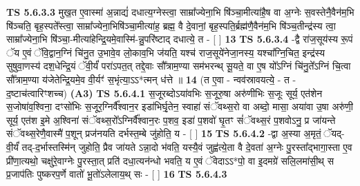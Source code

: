 \documentclass[17pt]{extarticle}
\begin{document}
                                \textbf{ TS 5.6.3.3} \newline
                  मुख॒त ए॒वास्मा॑ अ॒न्नाद्यं॑ दधात्य॒ग्नेस्त्वा॒ साम्रा᳚ज्येना॒भि षि॑ञ्चा॒मीत्या॑है॒ष वा अ॒ग्नेः स॒वस्तेनै॒वैन॑म॒भि षि॑ञ्चति॒ बृह॒स्पते᳚स्त्वा॒ साम्रा᳚ज्येना॒भिषि॑ञ्चा॒मीत्या॑ह॒ ब्रह्म॒ वै दे॒वानां॒ बृह॒स्पति॒र्ब्रह्म॑णै॒वैन॑म॒भि षि॑ञ्च॒तीन्द्र॑स्य त्वा॒ साम्रा᳚ज्येना॒भि षि॑ञ्चा॒-मीत्या॑हेन्द्रि॒यमे॒वास्मि॑-न्नु॒परि॑ष्टाद् दधात्ये॒ त - [  ] \textbf{  13} \newline
                  \newline
                                \textbf{ TS 5.6.3.4} \newline
                  -द्वै रा॑ज॒सूय॑स्य रू॒पं ॅय ए॒वं ॅवि॒द्वान॒ग्निं चि॑नु॒त उ॒भावे॒व लो॒काव॒भि ज॑यति॒ यश्च॑ राज॒सूये॑नेजा॒नस्य॒ यश्चा᳚ग्नि॒चित॒ इन्द्र॑स्य सुषुवा॒णस्य॑ दश॒धेन्द्रि॒यं ॅवी॒र्यं॑ परा॑ऽपत॒त् तद्दे॒वाः सौ᳚त्राम॒ण्या सम॑भरन्थ् सू॒यते॒ वा ए॒ष यो᳚ऽग्निं चि॑नु॒ते᳚ऽग्निं चि॒त्वा सौ᳚त्राम॒ण्या य॑जेतेन्द्रि॒यमे॒व वी॒र्यꣳ॑ स॒भृंत्या॒ऽऽ*त्मन् ध॑त्ते ॥ \textbf{  14} \newline
                  \newline
                      (त ए॒वा - न्वव॑स्रावयत्ये॒ - त - द॒ष्टाच॑त्वारिꣳशच्च)  \textbf{(A3)} \newline \newline
                                        \textbf{ TS 5.6.4.1} \newline
                  स॒जूरब्दोऽया॑वभिः स॒जूरु॒षा अरु॑णीभिः स॒जूः सूर्य॒ एत॑शेन स॒जोषा॑व॒श्विना॒ दꣳसो॑भिः स॒जूर॒ग्निर्वै᳚श्वान॒र इडा॑भिर्घृ॒तेन॒ स्वाहा॑ संॅवथ्स॒रो वा अब्दो॒ मासा॒ अया॑वा उ॒षा अरु॑णी॒ सूर्य॒ एत॑श इ॒मे अ॒श्विना॑ संॅवथ्स॒रो᳚ऽग्निर्वै᳚श्वान॒रः प॒शव॒ इडा॑ प॒शवो॑ घृ॒तꣳ सं॑ॅवथ्स॒रं प॒शवोऽनु॒ प्र जा॑यन्ते संॅवथ्स॒रेणै॒वास्मै॑ प॒शून् प्रज॑नयति दर्भस्त॒म्बे जु॑होति॒ य - [  ] \textbf{  15} \newline
                  \newline
                                \textbf{ TS 5.6.4.2} \newline
                  -द्वा अ॒स्या अ॒मृतं॒ ॅयद्-वी॒र्यं॑ तद्-द॒र्भास्तस्मि॑न् जुहोति॒ प्रैव जा॑यते ऽन्ना॒दो भ॑वति॒ यस्यै॒वं जुह्व॑त्ये॒ता वै दे॒वता॑ अ॒ग्नेः पु॒रस्ता᳚द्भागा॒स्ता ए॒व प्री॑णा॒त्यथो॒ चक्षु॑रे॒वाग्नेः पु॒रस्ता॒त् प्रति॑ दधा॒त्यन॑न्धो भवति॒ य ए॒वं ॅवेदाऽऽ*पो॒ वा इ॒दमग्रे॑ सलि॒लमा॑सी॒थ् स प्र॒जाप॑तिः पुष्करप॒र्णे वातो॑ भू॒तो॑ऽलेलाय॒थ् सः - [  ] \textbf{  16} \newline
                  \newline
                                \textbf{ TS 5.6.4.3} \newline
\end{document}
